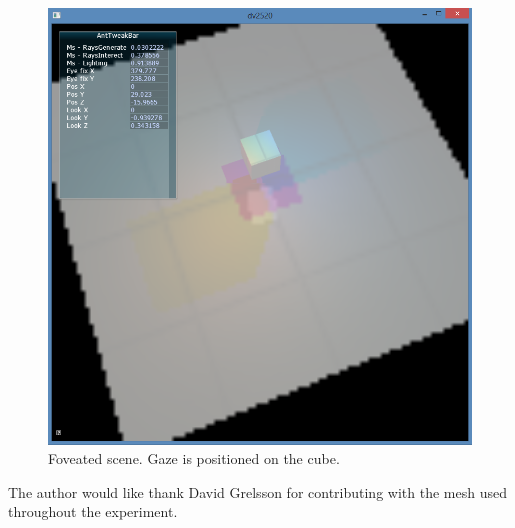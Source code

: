 \begin{figure}[h]
  \centering
  \includegraphics[width=0.75\linewidth]{img/fov_rt_et.png}
  \caption{Foveated scene. Gaze is positioned on the cube.}
  \label{fig:fov}
\end{figure}

\noindent
The author would like thank David Grelsson for contributing with the mesh used throughout the experiment.
